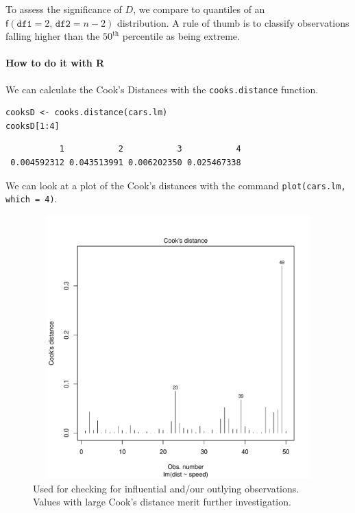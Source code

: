 \documentclass[captions=tableheading]{scrbook}
\begin{document}
To assess the significance of \(D\), we compare to quantiles of an \(\mathsf{f}(\mathtt{df1}=2,\,\mathtt{df2}=n-2)\) distribution. A rule of thumb is to classify observations falling higher than the \(50^{\mathrm{th}}\) percentile as being extreme. 

\paragraph*{How to do it with \textsf{R}}

We can calculate the Cook's Distances with the \texttt{cooks.distance} function.


\begin{verbatim}
cooksD <- cooks.distance(cars.lm)
cooksD[1:4]
\end{verbatim}

\begin{verbatim}
           1           2           3           4 
 0.004592312 0.043513991 0.006202350 0.025467338
\end{verbatim}

We can look at a plot of the Cook's distances with the command \texttt{plot(cars.lm, which = 4)}.

\begin{figure}[ht!]
  \includegraphics[width=5in, height=4in]{img/Cooks-distance-cars.pdf}
  \caption[Cook's distances for the \texttt{cars} data]{\small Used for checking for influential and/our outlying observations. Values with large Cook's distance merit further investigation.}
  \label{fig:Cooks-distance-cars}
\end{figure}
\end{document}
